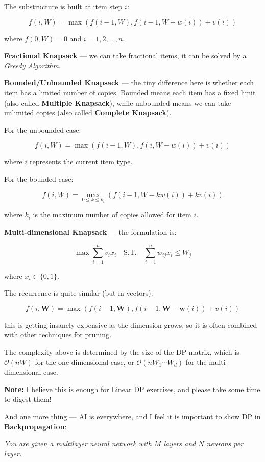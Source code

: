 \documentclass{article}
\begin{document}
The substructure is built at item step $i$:

$$
f(i,W)=\max(f(i-1,W),f(i-1,W-w(i))+v(i))
$$

where $f(0,W)=0$ and $i=1,2,\dots,n$.

\textbf{Fractional Knapsack} --- we can take fractional items, it can be solved by a \emph{Greedy Algorithm}.

\textbf{Bounded/Unbounded Knapsack} --- the tiny difference here is whether each item has a limited number of copies. Bounded means each item has a fixed limit (also called \textbf{Multiple Knapsack}), while unbounded means we can take unlimited copies (also called \textbf{Complete Knapsack}).

For the unbounded case:

$$
f(i,W)=\max(f(i-1,W),f(i,W-w(i))+v(i))
$$

where $i$ represents the current item type.

For the bounded case:

$$
f(i,W)=\max_{0\leq k\leq k_i}(f(i-1,W-kw(i))+kv(i))
$$

where $k_i$ is the maximum number of copies allowed for item $i$.

\textbf{Multi-dimensional Knapsack} --- the formulation is:

$$
\max \sum_{i=1}^n v_ix_i
\quad \text{S.T.}\quad
\sum_{i=1}^n w_{ij}x_i\leq W_j
$$

where $x_i\in\{0,1\}$.

The recurrence is quite similar (but in vectors):

$$
f(i,\boldsymbol W)=\max(f(i-1,\boldsymbol W),f(i-1,\boldsymbol W-\boldsymbol w(i))+v(i))
$$

this is getting insanely expensive as the dimension grows, so it is often combined with other techniques for pruning.


The complexity above is determined by the size of the DP matrix, which is $\mathcal O(nW)$ for the one-dimensional case, or $\mathcal O(nW_1\cdots W_d)$ for the multi-dimensional case.

\textbf{Note:} I believe this is enough for Linear DP exercises, and please take some time to digest them!



And one more thing --- AI is everywhere, and I feel it is important to show DP in \textbf{Backpropagation}:

\emph{You are given a multilayer neural network with $M$ layers and $N$ neurons per layer.}
\end{document}
